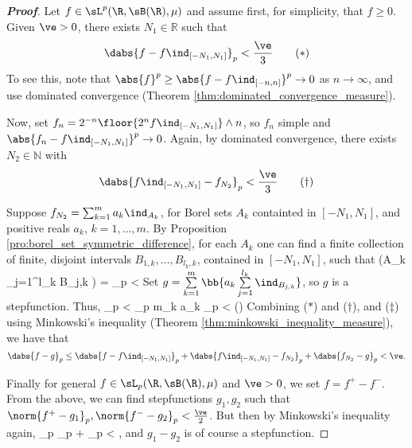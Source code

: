 \begin{proof}[\bf Proof]
Let $f \in \sL^p(\R,\sB(\R),\mu)$ and assume first, for simplicity, that $f \geq 0$. Given $\ve>0$, there exists $N_1 \in \mathbb{R}$ such that
\begin{equation}
 \dabs{f-f\ind_{[-N_1,N_1]}}_p < \frac{\ve}{3}\quad\quad (*)
\end{equation}
To see this, note that $\abs{f}^p \geq \abs{f-f\ind_{[-n,n]}}^p \to 0$ as $n \to \infty$, and use dominated convergence (Theorem \ref{thm:dominated_convergence_measure}).

Now, set $f_n = 2^{-n} \floor{2^n f \ind_{[-N_1,N_1]}} \wedge n$, so $f_n$ simple and $\abs{f_n - f\ind_{[-N_1,N_1]}}^p \to 0$. Again, by dominated convergence, there exists $N_2 \in \mathbb{N}$ with
\begin{equation}
\dabs{f\ind_{[-N_1,N_1]} - f_{N_2}}_p < \frac{\ve}{3}\quad\quad (\dag)
\end{equation}

Suppose $f_{N_2} = \sum_{k=1} ^m a_k \ind _{A_k}$, for Borel sets $A_k$ containted in $[-N_1,N_1]$, and positive reals $a_k$, $k=1,\ldots,m$. By Proposition \ref{pro:borel_set_symmetric_difference}, for each $A_k$ one can find a finite collection of finite, disjoint intervals $B_{1,k},\dots,B_{l_k, k}$, contained in $[-N_1,N_1]$, such that
\be
\mu\left(A_k \triangle \bigcup_{j=1}^{l_k} B_{j,k} \right) = _p < 
\ee
Set $g= \sum\limits_{k=1} ^m \bb{ a_k \sum\limits_{j=1} ^{l_k} \ind_{B_{j,k}} }$, so $g$ is a stepfunction. Thus,
\be
{}_p < _p \leq m\max_k a_k _p < \quad \quad (\ddag)
\ee
Combining ($*$) and ($\dag$), and ($\ddag$) using Minkowski's inequality (Theorem \ref{thm:minkowski_inequality_measure}), we have that
\[
 \dabs{f-g}_p \leq \dabs{f-f\ind_{[-N_1,N_1]}}_p + \dabs{f\ind_{[-N_1,N_1]} - f_{N_2}}_p + \dabs{f_{N_2} - g}_p < \ve.
\]

Finally for general $f \in \sL_p(\R,\sB(\R),\mu)$ and $\ve >0$, we set $f = f^+ - f^-$. From the above, we can find stepfunctions $g_1, g_2$ such that $\norm{f^+ - g_1}_p, \norm{f^- - g_2}_p < \frac{\ve}{2}$. But then by Minkowski's inequality again,
\be
{}_p \leq {}_p + _p < \epsilon,
\ee
and $g_1 - g_2$ is of course a stepfunction.
\end{proof}



